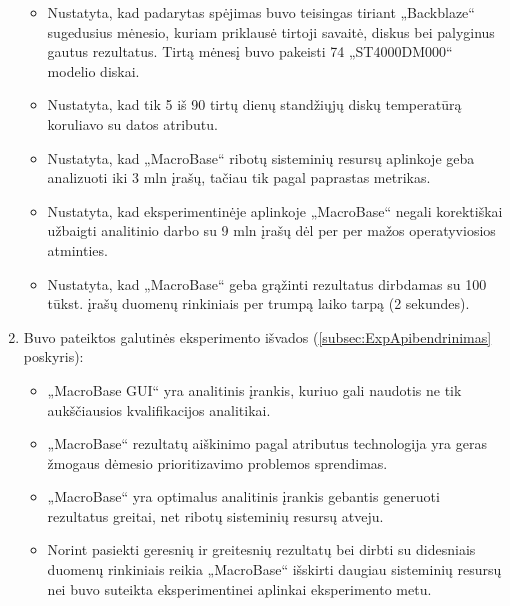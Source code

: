 \documentclass{VUMIFPSkursinis}
\begin{document}
\begin{enumerate}
\begin{itemize}
\item Nustatyta, kad padarytas spėjimas buvo teisingas tiriant „Backblaze“ sugedusius mėnesio, kuriam priklausė tirtoji savaitė, diskus bei palyginus gautus rezultatus. Tirtą mėnesį buvo pakeisti 74 „ST4000DM000“ modelio diskai.

\item Nustatyta, kad tik 5 iš 90 tirtų dienų standžiųjų diskų temperatūrą koruliavo su datos atributu.

\item Nustatyta, kad „MacroBase“ ribotų sisteminių resursų aplinkoje geba analizuoti iki 3 mln įrašų, tačiau tik pagal paprastas metrikas.

\item Nustatyta, kad eksperimentinėje aplinkoje „MacroBase“ negali korektiškai užbaigti analitinio darbo su 9 mln įrašų dėl per per mažos operatyviosios atminties.

\item Nustatyta, kad „MacroBase“ geba grąžinti rezultatus dirbdamas su 100 tūkst. įrašų duomenų rinkiniais per trumpą laiko tarpą (2 sekundes).
\end{itemize}

\item Buvo pateiktos galutinės eksperimento išvados (\ref{subsec:ExpApibendrinimas} poskyris):
\begin{itemize}
\item „MacroBase GUI“ yra analitinis įrankis, kuriuo gali naudotis ne tik aukščiausios kvalifikacijos analitikai.

\item „MacroBase“ rezultatų aiškinimo pagal atributus technologija yra geras žmogaus dėmesio prioritizavimo problemos sprendimas.

\item „MacroBase“ yra optimalus analitinis įrankis gebantis generuoti rezultatus greitai, net ribotų sisteminių resursų atveju.

\item Norint pasiekti geresnių ir greitesnių rezultatų bei dirbti su didesniais duomenų rinkiniais reikia „MacroBase“ išskirti daugiau sisteminių resursų nei buvo suteikta eksperimentinei aplinkai eksperimento metu.
\end{itemize}
\end{enumerate}

\printbibliography[heading=bibintoc]
\end{document}
